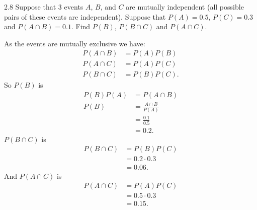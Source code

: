 
\begin{problem}{2.8}
  Suppose that 3 events $A$, $B$, and $C$ are mutually independent (all possible pairs of these events are independent).
  Suppose that $P (A) = \num{0,5}$, $P (C) = \num{0,3}$ and $P ( A \cap B ) = \num{0,1} $.
  Find $P (B)$, $P (B \cap C)$ and $P (A \cap C)$.
\end{problem}

\begin{derivation}
  As the events are mutually exclusive we have:
  \begin{align*}
    P(A \cap B) &= P(A)P(B) \\
    P(A \cap C) &= P(A) P(C) \\
    P(B \cap C) &= P(B)P(C)
  .\end{align*}
  So $P(B)$ is
  \begin{align*}
    P(B) P(A) &= P(A \cap B) \\
    P(B) &= \frac{A \cap B}{P(A)}\\
    &= \frac{\num{0,1}}{\num{0,5} } \\
    &= \num{0,2}
  .\end{align*}
  $P(B \cap C)$ is
  \begin{align*}
    P(B \cap C) &= P(B)P(C) \\
    &= \num{0,2} \cdot \num{0,3} \\
    &= \num{0,06} 
  .\end{align*}
  And $P(A \cap C)$ is
  \begin{align*}
    P(A \cap C) &= P(A) P(C) \\
    &= \num{0,5} \cdot \num{0,3}  \\
    &= \num{0,15} 
  .\end{align*}
\end{derivation}



